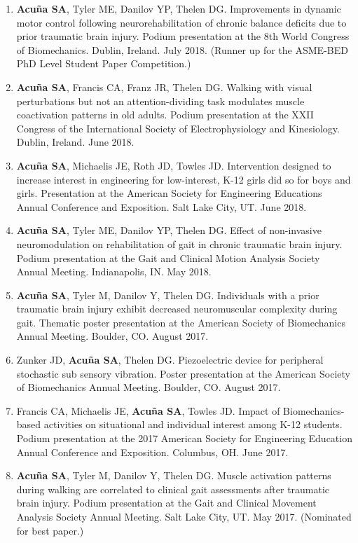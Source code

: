 \documentclass[letterpaper, 10pt]{article}
\begin{document}
\begin{enumerate}
    \item \textbf{Acuña SA}, Tyler ME, Danilov YP, Thelen DG. Improvements in dynamic motor control following neurorehabilitation of chronic balance deﬁcits due to prior traumatic brain injury. Podium presentation at the 8th World Congress of Biomechanics. Dublin, Ireland. July 2018. (Runner up for the ASME-BED PhD Level Student Paper Competition.)
    \item \textbf{Acuña SA}, Francis CA, Franz JR, Thelen DG. Walking with visual perturbations but not an attention-dividing task modulates muscle coactivation patterns in old adults. Podium presentation at the XXII Congress of the International Society of Electrophysiology and Kinesiology. Dublin, Ireland. June 2018.
    \item \textbf{Acuña SA}, Michaelis JE, Roth JD, Towles JD. Intervention designed to increase interest in engineering for low-interest, K-12 girls did so for boys and girls. Presentation at the American Society for Engineering Educations Annual Conference and Exposition. Salt Lake City, UT. June 2018.
    \item \textbf{Acuña SA}, Tyler ME, Danilov YP, Thelen DG. Effect of non-invasive neuromodulation on rehabilitation of gait in chronic traumatic brain injury. Podium presentation at the Gait and Clinical Motion Analysis Society Annual Meeting. Indianapolis, IN. May 2018.
    \item \textbf{Acuña SA}, Tyler M, Danilov Y, Thelen DG. Individuals with a prior traumatic brain injury exhibit decreased neuromuscular complexity during gait. Thematic poster presentation at the American Society of Biomechanics Annual Meeting. Boulder, CO. August 2017.
    \item Zunker JD, \textbf{Acuña SA}, Thelen DG. Piezoelectric device for peripheral stochastic sub sensory vibration. Poster presentation at the American Society of Biomechanics Annual Meeting. Boulder, CO. August 2017.
    \item Francis CA, Michaelis JE, \textbf{Acuña SA}, Towles JD. Impact of Biomechanics-based activities on situational and individual interest among K-12 students. Podium presentation at the 2017 American Society for Engineering Education Annual Conference and Exposition. Columbus, OH. June 2017.
    \item \textbf{Acuña SA}, Tyler M, Danilov Y, Thelen DG. Muscle activation patterns during walking are correlated to clinical gait assessments after traumatic brain injury. Podium presentation at the Gait and Clinical Movement Analysis Society Annual Meeting. Salt Lake City, UT. May 2017. (Nominated for best paper.)

\end{enumerate}
\end{document}
